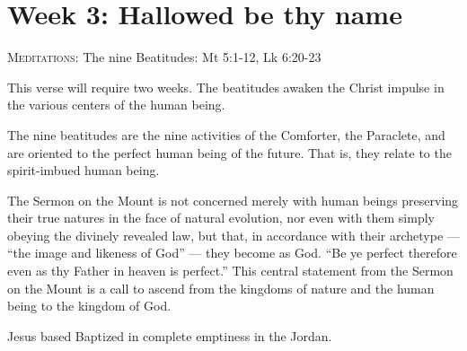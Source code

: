 \chapter{Week 3: Hallowed be thy name}

\textsc{Meditations}: The nine Beatitudes: Mt 5:1-12, Lk 6:20-23

This verse will require two weeks. The beatitudes awaken the Christ impulse in the various centers of the human being.

The nine beatitudes are the nine activities of the Comforter, the Paraclete, and are oriented to the perfect human being of the future. That is, they relate to the spirit-imbued human being.

\begin{quotex}
The Sermon on the Mount is not concerned merely with human beings preserving their true natures in the face of natural evolution, nor even with them simply obeying the divinely revealed law, but that, in accordance with their archetype — ``the image and likeness of God'' — they become as God. ``Be ye perfect therefore even as thy Father in heaven is perfect.'' This central statement from the Sermon on the Mount is a call to ascend from the kingdoms of nature and the human being to the kingdom of God. 

\end{quotex}
Jesus based Baptized in complete emptiness in the Jordan.

